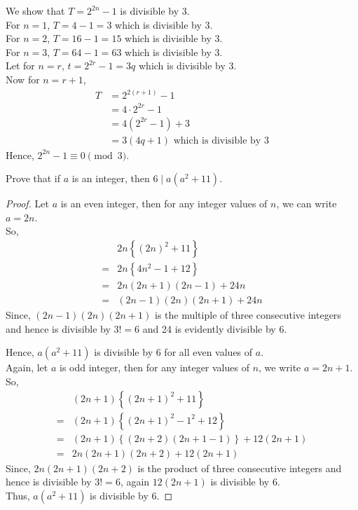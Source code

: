 \documentclass[12pt,class=book,crop=false]{standalone}
\begin{document}
\begin{soln}
    We show that $ T=2^{2n}-1 $ is divisible by 3.\\
    For $ n=1 $, $ T=4-1=3 $ which is divisible by 3.\\
    For $ n=2 $, $ T=16-1=15 $ which is divisible by 3.\\
    For $ n=3 $, $ T=64-1=63 $ which is divisible by 3.\\

    Let for $ n=r $, $ t=2^{2r}-1=3q $ which is divisible by 3.\\
    Now for $ n=r+1 $,
    \begin{align*}
        T&= 2^{2(r+1)}-1\\
        &= 4\cdot2^{2r}-1\\
        &= 4\left(2^{2r}-1\right)+3\\
        &= 3\left(4q+1\right) \text{ which is divisible by }3
    \end{align*}
    Hence, $ 2^{2n}-1\equiv 0 \pmod{3} $.
\end{soln}
\begin{qn}
    Prove that if $ a $ is an integer, then $ 6\mid a(a^2+11) $.
\end{qn}
\begin{proof}
    Let $ a $ is an even integer, then for any integer values of $ n $, we can write $ a=2n $.\\
    So,
    \begin{align*}
        &2n\left\{ (2n)^2+11 \right\}\\
        =&2n\left\{ 4n^2-1+12 \right\}\\
        =&2n(2n+1)(2n-1)+24n\\
        =&(2n-1)(2n)(2n+1)+24n
    \end{align*}
    Since, $ (2n-1)(2n)(2n+1) $ is the multiple of three consecutive integers and hence is divisible by $ 3!=6 $ and 24 is evidently divisible by 6.

    Hence, $ a(a^2+11) $ is divisible by 6 for all even values of $ a $.\\

    Again, let $ a $ is odd integer, then for any integer values of $ n $, we write $ a=2n+1 $.\\
    So,
    \begin{align*}
        &(2n+1)\left\{ (2n+1)^2+11 \right\}\\
        =&(2n+1)\left\{ (2n+1)^2-1^2+12 \right\}\\
        =&(2n+1)\left\{(2n+2)(2n+1-1)\right\}+12(2n+1)\\
        =&2n(2n+1)(2n+2)+12(2n+1)
    \end{align*}
    Since, $ 2n(2n+1)(2n+2) $ is the product of three consecutive integers and hence is divisible by $ 3!=6 $, again $ 12(2n+1) $ is divisible by 6.\\

    Thus, $ a(a^2+11) $ is divisible by 6.
\end{proof}
\end{document}
